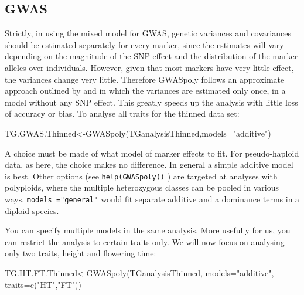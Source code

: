 \documentclass[
]{book}
\newenvironment{Shaded}{\begin{snugshade}}{\end{snugshade}}
\newcommand{\AttributeTok}[1]{\textcolor[rgb]{0.77,0.63,0.00}{#1}}
\newcommand{\FunctionTok}[1]{\textcolor[rgb]{0.00,0.00,0.00}{#1}}
\newcommand{\NormalTok}[1]{#1}
\newcommand{\OtherTok}[1]{\textcolor[rgb]{0.56,0.35,0.01}{#1}}
\newcommand{\StringTok}[1]{\textcolor[rgb]{0.31,0.60,0.02}{#1}}
\begin{document}
\hypertarget{gwas}{%
\subsection{GWAS}\label{gwas}}

Strictly, in using the mixed model for GWAS, genetic variances and covariances should be estimated separately for every marker, since the estimates will vary depending on the magnitude of the SNP effect and the distribution of the marker alleles over individuals. However, given that most markers have very little effect, the variances change very little.
Therefore GWASpoly follows an approximate approach outlined by \citet{kang_variance_2010} and \citet{zhang_mixed_2010} in which the variances are estimated only once, in a model without any SNP effect. This greatly speeds up the analysis with little loss of accuracy or bias. To analyse all traits for the thinned data set:

\begin{Shaded}
\begin{Highlighting}[]
\NormalTok{TG.GWAS.Thinned}\OtherTok{\textless{}{-}}\FunctionTok{GWASpoly}\NormalTok{(TGanalysisThinned,}\AttributeTok{models=}\StringTok{"additive"}\NormalTok{) }
\end{Highlighting}
\end{Shaded}

A choice must be made of what model of marker effects to fit. For pseudo-haploid data, as here, the choice makes no difference. In general a simple additive model is best. Other options (see \texttt{help(GWASpoly()} ) are targeted at analyses with polyploids, where the multiple heterozygous classes can be pooled in various ways. \texttt{models\ ="general"} would fit separate additive and a dominance terms in a diploid species.

You can specify multiple models in the same analysis. More usefully for us, you can restrict the analysis to certain traits only. We will now focus on analysing only two traits, height and flowering time:

\begin{Shaded}
\begin{Highlighting}[]
\NormalTok{TG.HT.FT.Thinned}\OtherTok{\textless{}{-}}\FunctionTok{GWASpoly}\NormalTok{(TGanalysisThinned, }\AttributeTok{models=}\StringTok{"additive"}\NormalTok{, }\AttributeTok{traits=}\FunctionTok{c}\NormalTok{(}\StringTok{"HT"}\NormalTok{,}\StringTok{"FT"}\NormalTok{)) }
\end{Highlighting}
\end{Shaded}
\end{document}

